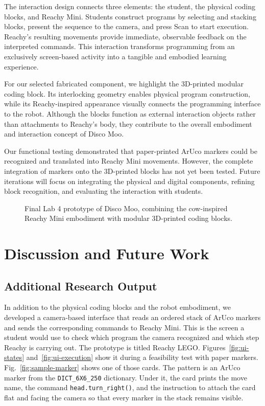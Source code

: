 \documentclass[conference]{IEEEtran}
\newcommand{\fillin}[1]{\textcolor{gray}{\textit{[#1]}}}
\newcommand{\figureplaceholder}[1]{\fbox{\parbox[c][1in][c]{0.92\linewidth}{\centering\fillin{#1}}}}
\begin{document}
The interaction design connects three elements: the student, the physical coding blocks, and Reachy Mini. Students construct programs by selecting and stacking blocks, present the sequence to the camera, and press Scan to start execution. Reachy's resulting movements provide immediate, observable feedback on the interpreted commands. This interaction transforms programming from an exclusively screen-based activity into a tangible and embodied learning experience.

For our selected fabricated component, we highlight the 3D-printed modular coding block. Its interlocking geometry enables physical program construction, while its Reachy-inspired appearance visually connects the programming interface to the robot. Although the blocks function as external interaction objects rather than attachments to Reachy's body, they contribute to the overall embodiment and interaction concept of Disco Moo.

Our functional testing demonstrated that paper-printed ArUco markers could be recognized and translated into Reachy Mini movements. However, the complete integration of markers onto the 3D-printed blocks has not yet been tested. Future iterations will focus on integrating the physical and digital components, refining block recognition, and evaluating the interaction with students.

\begin{figure}[t]
    \centering
    \figureplaceholder{Insert photo of the final Disco Moo prototype.}
    \caption{Final Lab 4 prototype of Disco Moo, combining the cow-inspired Reachy Mini embodiment with modular 3D-printed coding blocks.}
    \label{fig:finalrobot}
\end{figure}


\section{Discussion and Future Work}

\subsection{Additional Research Output}

In addition to the physical coding blocks and the robot embodiment, we developed a camera-based interface that reads an ordered stack of ArUco markers and sends the corresponding commands to Reachy Mini. This is the screen a student would use to check which program the camera recognized and which step Reachy is carrying out. The prototype is titled Reachy LEGO. Figures~\ref{fig:ui-states} and~\ref{fig:ui-execution} show it during a feasibility test with paper markers. Fig.~\ref{fig:sample-marker} shows one of those cards. The pattern is an ArUco marker from the \texttt{DICT\_6X6\_250} dictionary. Under it, the card prints the move name, the command \texttt{head.turn\_right()}, and the instruction to attach the card flat and facing the camera so that every marker in the stack remains visible.
\end{document}
